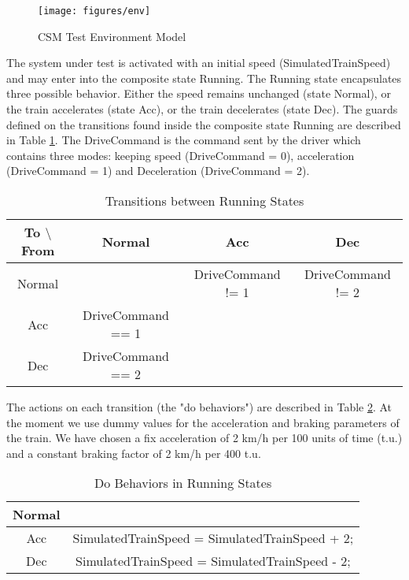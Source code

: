 \begin{figure}[ht!]
	\centering
	\texttt{[image: figures/env]}
	\caption{CSM Test Environment Model}
    \label{fig:env}
\end{figure}

The system under test is activated with an initial speed
(SimulatedTrainSpeed) and may enter into the composite state Running.
The Running state encapsulates three possible behavior. Either the
speed remains unchanged (state Normal), or the train accelerates
(state Acc), or the train decelerates (state Dec). The guards defined
on the transitions found inside the composite state Running are
described in Table \ref{tab:runningtr}. The DriveCommand is the
command sent by the driver which contains three modes: keeping speed
(DriveCommand = 0), acceleration (DriveCommand = 1) and Deceleration
(DriveCommand = 2).

\begin{table}[ht!]
\footnotesize
	\caption{Transitions between Running States}
	\begin{center}
    \begin{tabular}{|c|c|c|c|}
    \hline
    To $\setminus$ From  & Normal & Acc & Dec \\
    \hline
    Normal &   &  DriveCommand != 1  & DriveCommand != 2\\
    \hline
    Acc  & DriveCommand == 1 & &  \\
    \hline
    Dec  & DriveCommand == 2 & & \\
	\hline
    \end{tabular}
    \end{center}
\label{tab:runningtr}
\end{table} 

The actions on each transition (the "do behaviors") are described in
Table \ref{tab:runningdo}. At the moment we use dummy values for the
acceleration and braking parameters of the train. We have chosen a fix
acceleration of 2 km/h per 100 units of time (t.u.) and a constant
braking factor of 2 km/h per 400 t.u.

\begin{table}[ht!]
\footnotesize
	\caption{Do Behaviors in Running States}
	\begin{center}
    \begin{tabular}{|c|c|}
	\hline    
    Normal & \\
	\hline    
    Acc & SimulatedTrainSpeed = SimulatedTrainSpeed + 2; \\
	\hline    
    Dec & SimulatedTrainSpeed = SimulatedTrainSpeed - 2;\\
	\hline
    \end{tabular}
    \end{center}
\label{tab:runningdo}
\end{table} 

